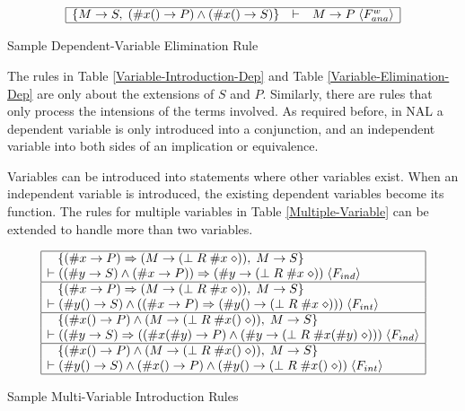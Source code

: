 \begin{table}[htb]
\[\begin{array}{|rcl|}
\hline
\{M \rightarrow S, \; (\#x() \rightarrow P) \wedge (\#x() \rightarrow S)\} & \vdash & M \rightarrow P \; \langle F^w_{ana}\rangle \\
\hline
\end{array}\]
\caption{Sample Dependent-Variable Elimination Rule}
\label{Variable-Elimination-Dep}
\end{table}

The rules in Table \ref{Variable-Introduction-Dep} and Table \ref{Variable-Elimination-Dep} are only about the extensions of $S$ and $P$. Similarly, there are rules that only process the intensions of the terms involved. As required before, in NAL a dependent variable is only introduced into a conjunction, and an independent variable into both sides of an implication or equivalence. 

Variables can be introduced into statements where other variables exist. When an independent variable is introduced, the existing dependent variables become its function. The rules for multiple variables in Table \ref{Multiple-Variable} can be extended to handle more than two variables.

\begin{table}[htb]
\[\begin{array}{|l|} \hline
\;\;\;\{(\#x \rightarrow P) \Rightarrow (M \rightarrow (\bot \; R  \; \#x \; \diamond)), \; M \rightarrow S\} \\ \vdash ((\#y \rightarrow S) \wedge (\#x \rightarrow P)) \Rightarrow (\#y \rightarrow (\bot \; R  \; \#x \; \diamond)) \; \langle F_{ind}\rangle  \\
\hline
\;\;\;\{(\#x \rightarrow P) \Rightarrow (M \rightarrow (\bot \; R  \; \#x \; \diamond)), \; M \rightarrow S\} \\ \vdash (\#y() \rightarrow S) \wedge ((\#x \rightarrow P) \Rightarrow (\#y() \rightarrow (\bot \; R  \; \#x \; \diamond))) \; \langle F_{int}\rangle  \\
\hline
\;\;\;\{(\#x() \rightarrow P) \wedge (M \rightarrow (\bot \; R  \; \#x() \; \diamond)), \; M \rightarrow S\} \\ \vdash ((\#y \rightarrow S) \Rightarrow ((\#x(\#y) \rightarrow P) \wedge (\#y \rightarrow (\bot \; R  \; \#x(\#y) \; \diamond))) \; \langle F_{ind}\rangle  \\
\hline
\;\;\;\{(\#x() \rightarrow P) \wedge (M \rightarrow (\bot \; R  \; \#x() \; \diamond)), \; M \rightarrow S\} \\ \vdash (\#y() \rightarrow S) \wedge (\#x() \rightarrow P) \wedge (\#y() \rightarrow (\bot \; R  \; \#x() \; \diamond)) \; \langle F_{int}\rangle  \\
\hline \end{array} \]
\caption{Sample Multi-Variable Introduction Rules}
\label{Multiple-Variable}
\end{table}


